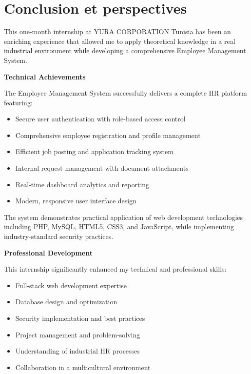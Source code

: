 \chapter*{Conclusion et perspectives}
\label{chap:conclusion}

\noindent This one-month internship at YURA CORPORATION Tunisia has been an enriching experience that allowed me to apply theoretical knowledge in a real industrial environment while developing a comprehensive Employee Management System.

\vspace{0.5cm}

\noindent \textbf{Technical Achievements}

The Employee Management System successfully delivers a complete HR platform featuring:
\begin{itemize}
    \item Secure user authentication with role-based access control
    \item Comprehensive employee registration and profile management
    \item Efficient job posting and application tracking system
    \item Internal request management with document attachments
    \item Real-time dashboard analytics and reporting
    \item Modern, responsive user interface design
\end{itemize}

The system demonstrates practical application of web development technologies including PHP, MySQL, HTML5, CSS3, and JavaScript, while implementing industry-standard security practices.

\vspace{0.5cm}

\noindent \textbf{Professional Development}

This internship significantly enhanced my technical and professional skills:
\begin{itemize}
    \item Full-stack web development expertise
    \item Database design and optimization
    \item Security implementation and best practices
    \item Project management and problem-solving
    \item Understanding of industrial HR processes
    \item Collaboration in a multicultural environment
\end{itemize}

